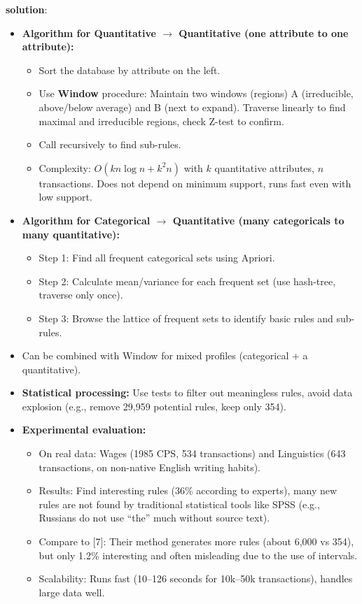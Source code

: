 \documentclass[12pt,letterpaper, onecolumn]{exam}
\begin{document}
\begin{questions}
\begin{solution}
        \textbf{solution}:
        \begin{itemize}
            \item \textbf{Algorithm for Quantitative $\to$ Quantitative (one attribute to one attribute):}
            \begin{itemize}
                \item Sort the database by attribute on the left.
                \item Use \textbf{Window} procedure: Maintain two windows (regions) A (irreducible, above/below average) and B (next to expand). Traverse linearly to find maximal and irreducible regions, check Z-test to confirm.
                \item Call recursively to find sub-rules.
                \item Complexity: $O(k n \log n + k^2 n)$ with $k$ quantitative attributes, $n$ transactions. Does not depend on minimum support, runs fast even with low support.
            \end{itemize}
            \item \textbf{Algorithm for Categorical $\to$ Quantitative (many categoricals to many quantitative):}
            \begin{itemize}
                \item Step 1: Find all frequent categorical sets using Apriori.
                \item Step 2: Calculate mean/variance for each frequent set (use hash-tree, traverse only once).
                \item Step 3: Browse the lattice of frequent sets to identify basic rules and sub-rules.
            \end{itemize}
            \item Can be combined with Window for mixed profiles (categorical + a quantitative).
            \item \textbf{Statistical processing:} Use tests to filter out meaningless rules, avoid data explosion (e.g., remove 29,959 potential rules, keep only 354).
            \item \textbf{Experimental evaluation:}
            \begin{itemize}
                \item On real data: Wages (1985 CPS, 534 transactions) and Linguistics (643 transactions, on non-native English writing habits).
                \item Results: Find interesting rules (36\% according to experts), many new rules are not found by traditional statistical tools like SPSS (e.g., Russians do not use ``the'' much without source text).
                \item Compare to [7]: Their method generates more rules (about 6,000 vs 354), but only 1.2\% interesting and often misleading due to the use of intervals.
                \item Scalability: Runs fast (10--126 seconds for 10k--50k transactions), handles large data well.
            \end{itemize}
        \end{itemize}



\end{solution}
\end{questions}
\end{document}
